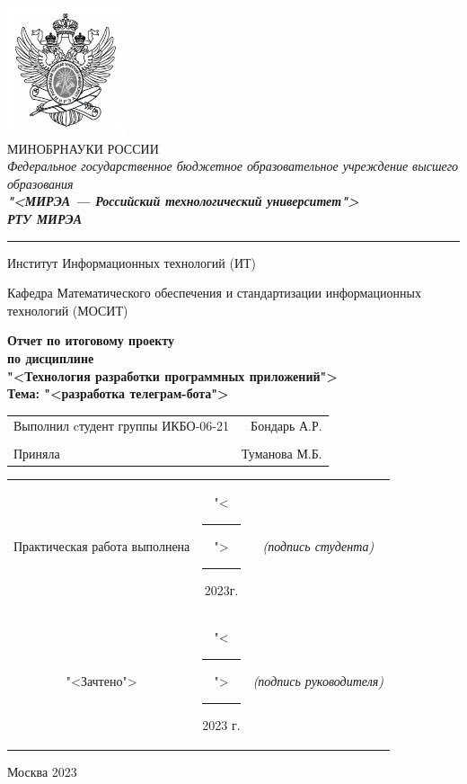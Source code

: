 \begin{center}
	\includegraphics[scale=0.5]{./res/logo.png}\\

	МИНОБРНАУКИ РОССИИ\\
	\textit{Федеральное государственное бюджетное
	образовательное учреждение высшего образования}\\
	\textbf{\textit{"<МИРЭА --- Российский технологический
	университет">}}\\
	{\large\bfseries\itshape РТУ МИРЭА}\\

	\bigskip \hrule \smallskip

	Институт Информационных технологий (ИТ)\\

	\vfill

	Кафедра Математического обеспечения и стандартизации
	информационных технологий (МОСИТ)\\

	\vfill

	\textbf{
		Отчет по итоговому проекту\\
		по дисциплине\\
		"<Технология разработки программных приложений">\\
		Тема: "<разработка телеграм-бота">\\
	}

	\vfill
	\vfill

	\begin{small}
		\begin{tabular}{lr}
			Выполнил cтудент группы ИКБО-06-21 & Бондарь А.Р.\\\\
			Приняла & Туманова М.Б.\\
		\end{tabular}
	\end{small}

	\vfill

	\begin{footnotesize}
		\begin{tabular}{ccc}
			Практическая  работа выполнена
			& "<\rule{1ex}{.5pt}">\rule{7ex}{.5pt}2023г.
			& \textit{(подпись студента)}\\
			"<Зачтено"> 
			& "<\rule{1ex}{.5pt}">\rule{7ex}{.5pt}2023 г.
			& \textit{(подпись руководителя)}\\
		\end{tabular}
	\end{footnotesize}

	\vfill

	Москва 2023
\end{center}

\thispagestyle{empty}

